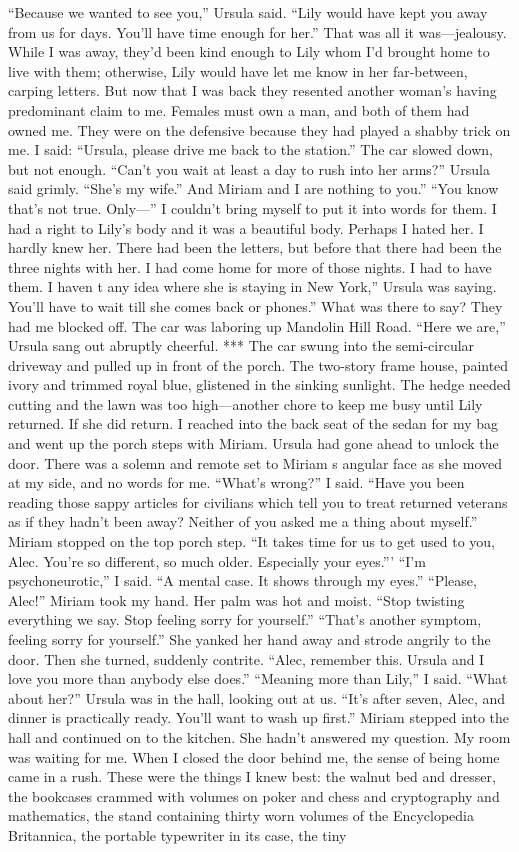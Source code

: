 \documentclass{novel}
\begin{document}
“Because we wanted to see you,” Ursula said. “Lily would have kept you away from us for days. You’ll have time enough for her.” That was all it was—jealousy. While I was away, they’d been kind enough to Lily whom I’d brought home to live with them; otherwise, Lily would have let me know in her far-between, carping letters. But now that I was back they resented another woman’s having predominant claim to me. Females must own a man, and both of them had owned me. They were on the defensive because they had played a shabby trick on me. I said: “Ursula, please drive me back to the station.” The car slowed down, but not enough. “Can’t you wait at least a day to rush into her arms?” Ursula said grimly. “She’s my wife.” And Miriam and I are nothing to you.” “You know that’s not true. Only—” I couldn’t bring myself to put it into words for them. I had a right to Lily’s body and it was a beautiful body. Perhaps I hated her. I hardly knew her. There had been the letters, but before that there had been the three nights with her. I had come home for more of those nights. I had to have them. I haven t any idea where she is staying in New York,” Ursula was saying. You’ll have to wait till she comes back or phones.” What was there to say? They had me blocked off. The car was laboring up Mandolin Hill Road. “Here we are,” Ursula sang out abruptly cheerful. *** The car swung into the semi-circular driveway and pulled up in front of the porch. The two-story frame house, painted ivory and trimmed royal blue, glistened in the sinking sunlight. The hedge needed cutting and the lawn was too high—another chore to keep me busy until Lily returned. If she did return. I reached into the back seat of the sedan for my bag and went up the porch steps with Miriam. Ursula had gone ahead to unlock the door. There was a solemn and remote set to Miriam s angular face as she moved at my side, and no words for me. “What’s wrong?” I said. “Have you been reading those sappy articles for civilians which tell you to treat returned veterans as if they hadn’t been away? Neither of you asked me a thing about myself.” Miriam stopped on the top porch step. “It takes time for us to get used to you, Alec. You’re so different, so much older. Especially your eyes.”’ “I’m psychoneurotic,” I said. “A mental case. It shows through my eyes.” “Please, Alec!” Miriam took my hand. Her palm was hot and moist. “Stop twisting everything we say. Stop feeling sorry for yourself.” “That’s another symptom, feeling sorry for yourself.” She yanked her hand away and strode angrily to the door. Then she turned, suddenly contrite. “Alec, remember this. Ursula and I love you more than anybody else does.” “Meaning more than Lily,” I said. “What about her?” Ursula was in the hall, looking out at us. “It’s after seven, Alec, and dinner is practically ready. You’ll want to wash up first.” Miriam stepped into the hall and continued on to the kitchen. She hadn’t answered my question. My room was waiting for me. When I closed the door behind me, the sense of being home came in a rush. These were the things I knew best: the walnut bed and dresser, the bookcases crammed with volumes on poker and chess and cryptography and mathematics, the stand containing thirty worn volumes of the Encyclopedia Britannica, the portable typewriter in its case, the tiny 
\end{document}
